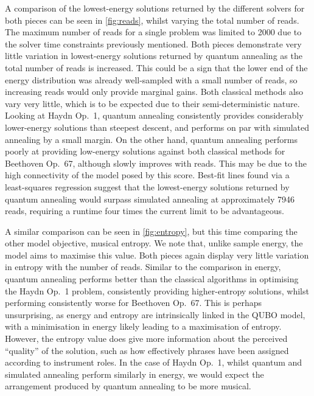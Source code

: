 \documentclass[twocolumn]{article}
\theoremstyle{definition}
\begin{document}
A comparison of the lowest-energy solutions returned by the different solvers for both pieces can be seen in \cref{fig:reads}, whilst varying the total number of reads. The maximum number of reads for a single problem was limited to \num{2000} due to the solver time constraints previously mentioned. Both pieces demonstrate very little variation in lowest-energy solutions returned by quantum annealing as the total number of reads is increased. This could be a sign that the lower end of the energy distribution was already well-sampled with a small number of reads, so increasing reads would only provide marginal gains. Both classical methods also vary very little, which is to be expected due to their semi-deterministic nature.
Looking at Haydn Op.\ 1, quantum annealing consistently provides considerably lower-energy solutions than steepest descent, and performs on par with simulated annealing by a small margin.
On the other hand, quantum annealing performs poorly at providing low-energy solutions against both classical methods for Beethoven Op.\ 67, although slowly improves with reads. This may be due to the high connectivity of the model posed by this score. Best-fit lines found via a least-squares regression suggest that the lowest-energy solutions returned by quantum annealing would surpass simulated annealing at approximately \num[round-precision=1]{7946} reads, requiring a runtime four times the current limit to be advantageous.

A similar comparison can be seen in \cref{fig:entropy}, but this time comparing the other model objective, musical entropy. We note that, unlike sample energy, the model aims to maximise this value. Both pieces again display very little variation in entropy with the number of reads. Similar to the comparison in energy, quantum annealing performs better than the classical algorithms in optimising the Haydn Op.\ 1 problem, consistently providing higher-entropy solutions, whilst performing consistently worse for Beethoven Op.\ 67. This is perhaps unsurprising, as energy and entropy are intrinsically linked in the QUBO model, with a minimisation in energy likely leading to a maximisation of entropy. However, the entropy value does give more information about the perceived ``quality'' of the solution, such as how effectively phrases have been assigned according to instrument roles. In the case of Haydn Op.\ 1, whilst quantum and simulated annealing perform similarly in energy, we would expect the arrangement produced by quantum annealing to be more musical.
\end{document}
